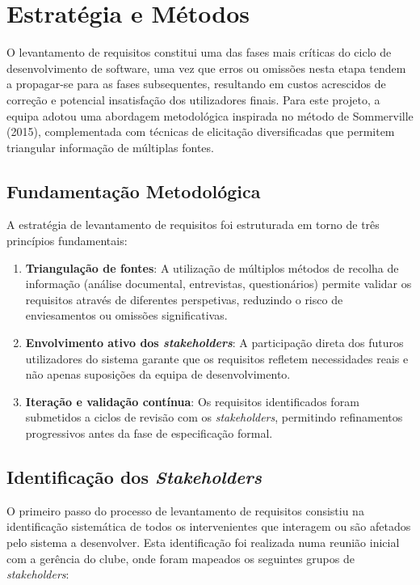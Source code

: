 \documentclass[a4paper,12pt]{scrreprt}
\begin{document}
\section{Estratégia e Métodos}

O levantamento de requisitos constitui uma das fases mais críticas do ciclo de desenvolvimento de software, uma vez que erros ou omissões nesta etapa tendem a propagar-se para as fases subsequentes, resultando em custos acrescidos de correção e potencial insatisfação dos utilizadores finais. Para este projeto, a equipa adotou uma abordagem metodológica inspirada no método de Sommerville (2015), complementada com técnicas de elicitação diversificadas que permitem triangular informação de múltiplas fontes.

\subsection{Fundamentação Metodológica}

A estratégia de levantamento de requisitos foi estruturada em torno de três princípios fundamentais:

\begin{enumerate}
    \item \textbf{Triangulação de fontes}: A utilização de múltiplos métodos de recolha de informação (análise documental, entrevistas, questionários) permite validar os requisitos através de diferentes perspetivas, reduzindo o risco de enviesamentos ou omissões significativas.

    \item \textbf{Envolvimento ativo dos \textit{stakeholders}}: A participação direta dos futuros utilizadores do sistema garante que os requisitos refletem necessidades reais e não apenas suposições da equipa de desenvolvimento.

    \item \textbf{Iteração e validação contínua}: Os requisitos identificados foram submetidos a ciclos de revisão com os \textit{stakeholders}, permitindo refinamentos progressivos antes da fase de especificação formal.
\end{enumerate}

\subsection{Identificação dos \textit{Stakeholders}}

O primeiro passo do processo de levantamento de requisitos consistiu na identificação sistemática de todos os intervenientes que interagem ou são afetados pelo sistema a desenvolver. Esta identificação foi realizada numa reunião inicial com a gerência do clube, onde foram mapeados os seguintes grupos de \textit{stakeholders}:
\end{document}
